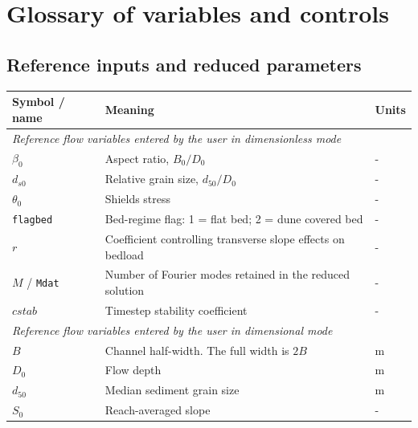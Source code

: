 \documentclass[11pt,a4paper]{article}
\begin{document}
\section{Glossary of variables and controls}

\subsection{Reference inputs and reduced parameters}
\label{SymbolList}

\begin{longtable}{p{} p{} >{\centering\arraybackslash}p{}}
\toprule
\textbf{Symbol / name} & \textbf{Meaning} & \textbf{Units} \\
\midrule
\endhead

\multicolumn{3}{l}{\textit{Reference flow variables entered by the user in dimensionless mode}} \\
\midrule
$\beta_0$       & Aspect ratio, $B_0/D_0$ & - \\
$d_{s0}$         & Relative grain size, $d_{50}/D_0$ & - \\
$\theta_0$      & Shields stress & - \\
\texttt{flagbed} & Bed-regime flag: 1 = flat bed; 2 = dune covered bed & - \\
$r$           & Coefficient controlling transverse slope effects on bedload & - \\
$M$ / \texttt{Mdat} & Number of Fourier modes retained in the reduced solution & - \\
$cstab$       & Timestep stability coefficient & - \\
\midrule

\multicolumn{3}{l}{\textit{Reference flow variables entered by the user in dimensional mode}} \\
\midrule
$B$           & Channel half-width. The full width is $2B$ & m \\
$D_0$         & Flow depth & m \\
$d_{50}$      & Median sediment grain size & m \\
$S_0$           & Reach-averaged slope & - \\


\end{longtable}
\end{document}
